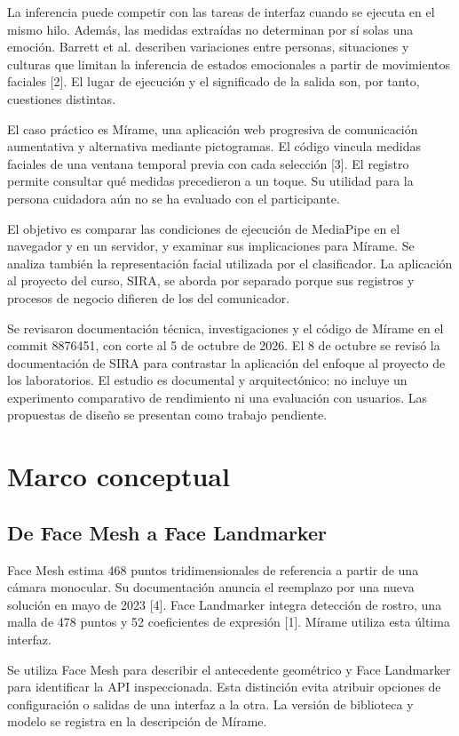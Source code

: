 \documentclass[conference,letterpaper]{IEEEtran}
\begin{document}
La inferencia puede competir con las tareas de interfaz cuando se ejecuta en el mismo hilo. Además, las medidas extraídas no determinan por sí solas una emoción. Barrett et al. describen variaciones entre personas, situaciones y culturas que limitan la inferencia de estados emocionales a partir de movimientos faciales [2]. El lugar de ejecución y el significado de la salida son, por tanto, cuestiones distintas.

El caso práctico es Mírame, una aplicación web progresiva de comunicación aumentativa y alternativa mediante pictogramas. El código vincula medidas faciales de una ventana temporal previa con cada selección [3]. El registro permite consultar qué medidas precedieron a un toque. Su utilidad para la persona cuidadora aún no se ha evaluado con el participante.

El objetivo es comparar las condiciones de ejecución de MediaPipe en el navegador y en un servidor, y examinar sus implicaciones para Mírame. Se analiza también la representación facial utilizada por el clasificador. La aplicación al proyecto del curso, SIRA, se aborda por separado porque sus registros y procesos de negocio difieren de los del comunicador.

Se revisaron documentación técnica, investigaciones y el código de Mírame en el commit 8876451, con corte al 5 de octubre de 2026. El 8 de octubre se revisó la documentación de SIRA para contrastar la aplicación del enfoque al proyecto de los laboratorios. El estudio es documental y arquitectónico: no incluye un experimento comparativo de rendimiento ni una evaluación con usuarios. Las propuestas de diseño se presentan como trabajo pendiente.


\section{Marco conceptual}

\subsection{De Face Mesh a Face Landmarker}
Face Mesh estima 468 puntos tridimensionales de referencia a partir de una cámara monocular. Su documentación anuncia el reemplazo por una nueva solución en mayo de 2023 [4]. Face Landmarker integra detección de rostro, una malla de 478 puntos y 52 coeficientes de expresión [1]. Mírame utiliza esta última interfaz.

Se utiliza Face Mesh para describir el antecedente geométrico y Face Landmarker para identificar la API inspeccionada. Esta distinción evita atribuir opciones de configuración o salidas de una interfaz a la otra. La versión de biblioteca y modelo se registra en la descripción de Mírame.
\end{document}
